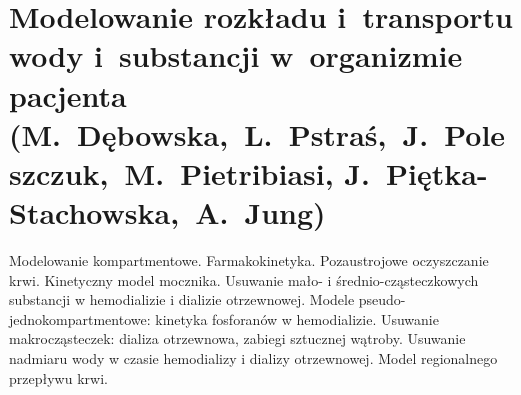 \chapter[Modelowanie rozkładu i~transportu wody i~substancji w~organizmie pacjenta]{Modelowanie rozkładu i~transportu wody i~substancji w~organizmie pacjenta\\{\large (M.~Dębowska,~L.~Pstraś,~J.~Poleszczuk,~M.~Pietribiasi, J.~\mbox{Piętka-Stachowska},~A.~Jung)}}

Modelowanie kompartmentowe. Farmakokinetyka. Pozaustrojowe oczyszczanie krwi. Kinetyczny model mocznika. Usuwanie mało- i średnio-cząsteczkowych substancji w hemodializie i dializie otrzewnowej. Modele pseudo-jednokompartmentowe: kinetyka fosforanów w hemodializie. Usuwanie makrocząsteczek: dializa otrzewnowa, zabiegi sztucznej wątroby. Usuwanie nadmiaru wody w czasie hemodializy i dializy otrzewnowej. Model regionalnego przepływu krwi. 